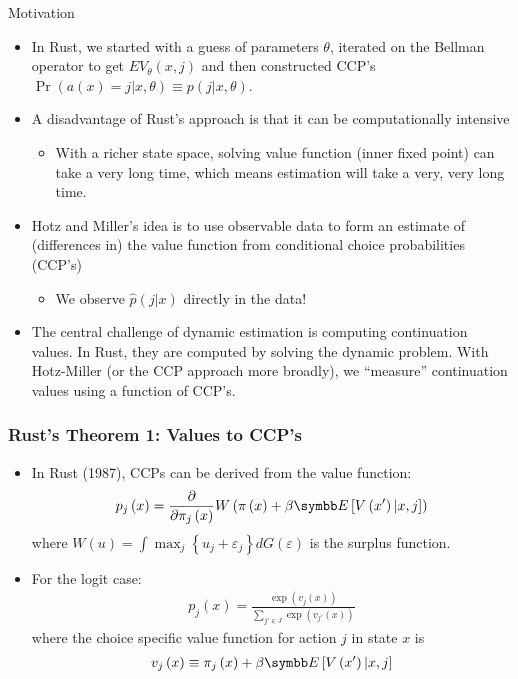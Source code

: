 \documentclass[aspectratio=169,11pt]{beamer}
\begin{document}
\begin{frame}{Motivation}
\begin{itemize}
	\item In Rust, we started with a guess of parameters $\theta$, iterated on the Bellman operator to get $EV_{\theta}(x,j)$ and then constructed CCP's $\Pr(a(x) = j | x,\theta) \equiv p(j | x,\theta)$.
	\item A disadvantage of Rust's approach is that it can be computationally intensive
	\begin{itemize}
		\item With a richer state space, solving value function (inner fixed point) 
		can take a very long time,
		which means estimation will take a very, very long time.
	\end{itemize}
	\item Hotz and Miller's idea is to use observable data to form an estimate 
	of (differences in) the value function from conditional choice probabilities (CCP's)
\begin{itemize}
\item We observe $\hat{p}(j | x)$ directly in the data!
\end{itemize}
	\item The central challenge of dynamic estimation is computing continuation values. 
	In Rust, they are computed by solving the dynamic problem.
	With Hotz-Miller (or the CCP approach more broadly), we ``measure'' continuation
	values using a function of CCP's.
	
\end{itemize}
\end{frame}

\begin{frame}
\frametitle{Rust's Theorem 1: Values to CCP's}
\begin{itemize}
	\item In Rust (1987), CCPs can be derived from the value function:
	\begin{align*}
		p_{j}\left( x\right) = \frac{\partial}{\partial \pi_{j} \left(x \right)} W\left( \pi\left( x \right) 
		+\beta \E\left[V\left(x' \right)|x,j\right]\right)
	\end{align*}
	where  
	$W\left(u\right) = \int \max_{j} \left\{ u_{j} +\varepsilon_{j}\right\}dG\left( \varepsilon\right)$
	is the surplus function.
	\medskip
	\item For the logit case:
	\begin{align*}
	p_{j}\left(x\right) = \frac{\exp\left(v_{j}\left(x\right)\right)}{\sum_{j'\in J}\exp\left(v_{j'}\left(x\right)\right)}
	\end{align*}
	where the choice specific value function for action $j$ in state $x$ is 
	\begin{align*}
	v_{j}\left(x\right) \equiv \pi_{j}\left(x\right)+\beta \E\left[V\left(x' \right)|x,j\right]
	\end{align*}
\end{itemize}
\end{frame}
\end{document}
